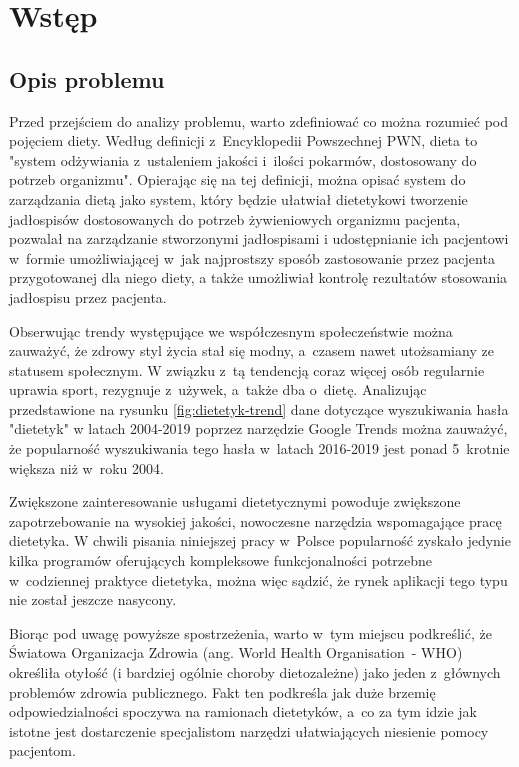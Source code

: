 \chapter*{Wstęp}\label{ch:admission}

\section*{Opis problemu}\label{sec:problem-description}

Przed przejściem do analizy problemu, warto zdefiniować co można rozumieć pod pojęciem diety.
Według definicji z~Encyklopedii Powszechnej PWN, dieta to "system odżywiania z~ustaleniem jakości i~ilości pokarmów,
dostosowany do potrzeb organizmu"\cite{book:encyklopedia-dieta}.
Opierając się na tej definicji, można opisać system do zarządzania dietą jako system,
który będzie ułatwiał dietetykowi tworzenie jadłospisów dostosowanych do potrzeb żywieniowych organizmu pacjenta, pozwalał na zarządzanie stworzonymi jadłospisami
i udostępnianie ich pacjentowi w~formie umożliwiającej w~jak najprostszy sposób zastosowanie przez pacjenta przygotowanej dla niego diety,
a także umożliwiał kontrolę rezultatów stosowania jadłospisu przez pacjenta.

\par
Obserwując trendy występujące we współczesnym społeczeństwie można zauważyć, że zdrowy styl życia stał się modny, a~czasem nawet utożsamiany ze statusem społecznym.
W związku z~tą tendencją coraz więcej osób regularnie uprawia sport, rezygnuje z~używek, a~także dba o~dietę.
Analizując przedstawione na rysunku \ref{fig:dietetyk-trend} dane dotyczące wyszukiwania hasła "dietetyk" w latach 2004-2019 poprzez narzędzie Google Trends\cite{url:google-trends} można zauważyć,
że popularność wyszukiwania tego hasła w~latach 2016-2019 jest ponad 5~krotnie większa niż w~roku 2004.


Zwiększone zainteresowanie usługami dietetycznymi powoduje zwiększone zapotrzebowanie na wysokiej jakości, nowoczesne narzędzia wspomagające pracę dietetyka.
W chwili pisania niniejszej pracy w~Polsce popularność zyskało jedynie kilka programów oferujących kompleksowe funkcjonalności potrzebne w~codziennej praktyce dietetyka,
można więc sądzić, że rynek aplikacji tego typu nie został jeszcze nasycony.

\par
Biorąc pod uwagę powyższe spostrzeżenia, warto w~tym miejscu podkreślić, że Światowa Organizacja Zdrowia (ang. World Health Organisation~- WHO) określiła otyłość
(i bardziej ogólnie choroby dietozależne) jako jeden z~głównych problemów zdrowia publicznego\cite{article:dietetyk-na-rynku-uslug-medycznych}.
Fakt ten podkreśla jak duże brzemię odpowiedzialności spoczywa na ramionach dietetyków,
a~co za tym idzie jak istotne jest dostarczenie specjalistom narzędzi ułatwiających niesienie pomocy pacjentom.

